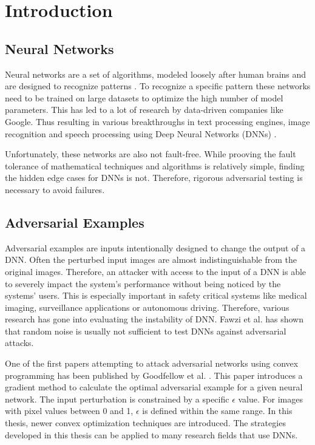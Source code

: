 \chapter{Introduction}\label{sec:chapter}

\section{Neural Networks}

\begingroup
Neural networks are a set of algorithms, modeled loosely after human brains and are designed to recognize patterns \cite{DeepIntro}.
To recognize a specific pattern these networks need to be trained on large datasets to optimize the high number of model parameters.
This has led to a lot of research by data-driven companies like Google. Thus resulting in various breakthroughs in text processing engines, image recognition
and speech processing using Deep Neural Networks (DNNs) \cite{GoogleTranslation, AlexNet, SpeechRecognition}.

Unfortunately, these networks are also not fault-free. While prooving the fault tolerance of
mathematical techniques and algorithms is relatively simple, finding the hidden edge cases for DNNs is not.
Therefore, rigorous adversarial testing is necessary to avoid failures.
\endgroup


\section{Adversarial Examples}\label{sec:section}

\begingroup
Adversarial examples are inputs intentionally designed to change the output of a DNN. Often the perturbed
input images are almost indistinguishable from the original images.
Therefore, an attacker with
access to the input of a DNN is able to severely impact the system's performance without being noticed by the systems' users.
This is especially important in safety critical systems like medical imaging, surveillance applications or autonomous driving.
Therefore, various research has gone into evaluating the instability of DNN. Fawzi et al. \cite{NeuralRandom} has shown
that random noise is usually not sufficient to test DNNs against adversarial attacks.

One of the first papers attempting to attack adversarial networks using convex programming has
been published by Goodfellow et al. \cite{Goodfellow}. This paper introduces a gradient method to calculate the
optimal adversarial example for a given neural network. The input perturbation is constrained by a specific $\epsilon$ value.
For images with pixel values between 0 and 1, $\epsilon$ is defined within the same range. In this thesis,
newer convex optimization techniques are introduced.
The strategies developed in this thesis can be applied to many research fields that use DNNs.

